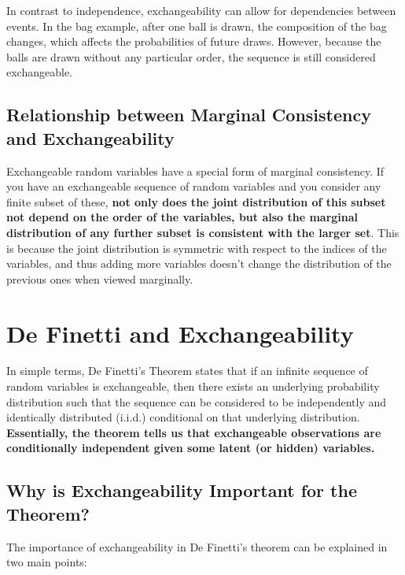 \documentclass{article}
\begin{document}
In contrast to independence, exchangeability can allow for dependencies between events. In the bag example, after one ball is drawn, the composition of the bag changes, which affects the probabilities of future draws. However, because the balls are drawn without any particular order, the sequence is still considered exchangeable.


\subsection{Relationship between Marginal Consistency and Exchangeability}

Exchangeable random variables have a special form of marginal consistency. If you have an exchangeable sequence of random variables and you consider any finite subset of these, \textbf{not only does the joint distribution of this subset not depend on the order of the variables, but also the marginal distribution of any further subset is consistent with the larger set}. This is because the joint distribution is symmetric with respect to the indices of the variables, and thus adding more variables doesn't change the distribution of the previous ones when viewed marginally.

\section{De Finetti and Exchangeability}
In simple terms, De Finetti’s Theorem states that if an infinite sequence of random variables is exchangeable, then there exists an underlying probability distribution such that the sequence can be considered to be independently and identically distributed (i.i.d.) conditional on that underlying distribution. \textbf{Essentially, the theorem tells us that exchangeable observations are conditionally independent given some latent (or hidden) variables.}

\subsection{Why is Exchangeability Important for the Theorem?}
The importance of exchangeability in De Finetti's theorem can be explained in two main points:
\end{document}
